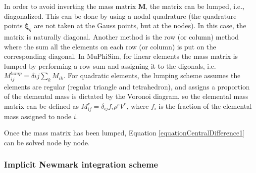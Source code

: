 \documentclass[oneside,11pt,times]{book}
\begin{document}
In order to avoid inverting the mass matrix $\bm{M}$, the matrix can be lumped, i.e., diagonalized. This can be done by using a nodal quadrature (the quadrature points $\bm{\xi}_q$ are not taken at the Gauss points, but at the nodes). In this case, the matrix is naturally diagonal. Another method is the row (or column) method where the sum all the elements on each row (or column) is put on the corresponding diagonal. In MuPhiSim, for linear elements the mass matrix is lumped by performing a row sum and assigning it to the digonals, i.e. $M^{lump}_{ij}=\delta{ij}\sum_{k}M_{ik}$. For quadratic elements, the lumping scheme assumes the elements are regular (regular triangle and tetrahedron), and assigns a proportion of the elemental mass is dictated by the Voronoi diagram, so the elemental mass matrix can be defined as $M^{e}_{ij}=\delta_{ij}f_i \rho^{e} V^{e}$, where $f_i$ is the fraction of the elemental mass assigned to node $i$.

Once the mass matrix has been lumped, Equation \eqref{equationCentralDifference1} can be solved node by node.

\subsubsection{Implicit Newmark integration scheme}
 \label{subsectionImplicitNewmarkScheme}
\end{document}
